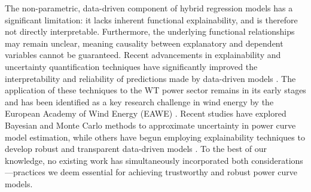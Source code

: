 The non-parametric, data-driven component of hybrid regression models has a significant limitation: it lacks inherent functional explainability, and is therefore not directly interpretable. Furthermore, the underlying functional relationships may remain unclear, meaning causality between explanatory and dependent variables cannot be guaranteed. Recent advancements in explainability and uncertainty quantification techniques have significantly improved the interpretability and reliability of predictions made by data-driven models \cite{Linardatos2020,Abdar2021}. The application of these techniques to the WT power sector remains in its early stages and has been identified as a key research challenge in wind energy by the European Academy of Wind Energy (EAWE) \cite{Kuik2016}. Recent studies have explored Bayesian \cite{Aerts2023,Mclean2023} and Monte Carlo \cite{Richter2022} methods to approximate uncertainty in power curve model estimation, while others have begun employing explainability techniques to develop robust and transparent data-driven models \cite{CAKIROGLU2024,LIAO2024,LETZGUS2024}. To the best of our knowledge, no existing work has simultaneously incorporated both considerations—practices we deem essential for achieving trustworthy and robust power curve models.

